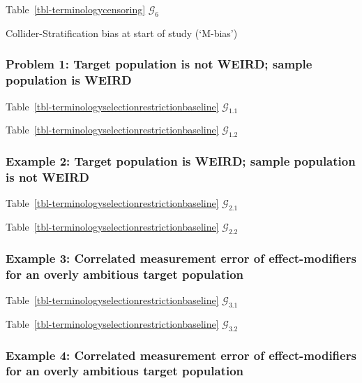 \documentclass[
  single column]{article}
\begin{document}
Table~\ref{tbl-terminologycensoring} \(\mathcal{G}_6\)

\begin{table}

\caption{\label{tbl-terminologyselectionrestrictionbaseline}Collider-Stratification
bias at start of study (`M-bias')}

\centering{

\terminologyselectionrestrictionbaseline

}

\end{table}%

\subsubsection{Problem 1: Target population is not WEIRD; sample
population is
WEIRD}\label{problem-1-target-population-is-not-weird-sample-population-is-weird}

Table~\ref{tbl-terminologyselectionrestrictionbaseline}
\(\mathcal{G}_{1.1}\)

Table~\ref{tbl-terminologyselectionrestrictionbaseline}
\(\mathcal{G}_{1.2}\)

\subsubsection{Example 2: Target population is WEIRD; sample population
is not
WEIRD}\label{example-2-target-population-is-weird-sample-population-is-not-weird}

Table~\ref{tbl-terminologyselectionrestrictionbaseline}
\(\mathcal{G}_{2.1}\)

Table~\ref{tbl-terminologyselectionrestrictionbaseline}
\(\mathcal{G}_{2.2}\)

\subsubsection{Example 3: Correlated measurement error of
effect-modifiers for an overly ambitious target
population}\label{example-3-correlated-measurement-error-of-effect-modifiers-for-an-overly-ambitious-target-population}

Table~\ref{tbl-terminologyselectionrestrictionbaseline}
\(\mathcal{G}_{3.1}\)

Table~\ref{tbl-terminologyselectionrestrictionbaseline}
\(\mathcal{G}_{3.2}\)

\subsubsection{Example 4: Correlated measurement error of
effect-modifiers for an overly ambitious target
population}\label{example-4-correlated-measurement-error-of-effect-modifiers-for-an-overly-ambitious-target-population}
\end{document}

